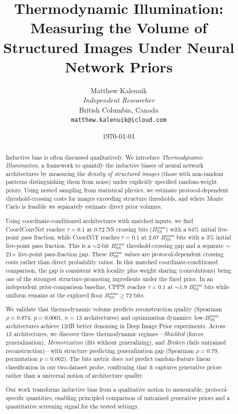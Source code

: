 \documentclass{article}
\title{Thermodynamic Illumination: Measuring the Volume of Structured Images Under Neural Network Priors}
\author{Matthew Kalenuik\\
\textit{Independent Researcher}\\
British Columbia, Canada\\
\texttt{matthew.kalenuik@icloud.com}}
\date{\today}
\begin{document}
\maketitle

\begin{abstract}
Inductive bias is often discussed qualitatively. We introduce \emph{Thermodynamic Illumination}, a framework to quantify the inductive biases of neural network architectures by measuring the \emph{density of structured images} (those with non-random patterns distinguishing them from noise) under explicitly specified random-weight priors. Using nested sampling from statistical physics, we estimate protocol-dependent threshold-crossing costs for images exceeding structure thresholds, and where Monte Carlo is feasible we separately estimate direct prior volumes.

Using coordinate-conditioned architectures with matched inputs, we find CoordConvNet reaches $\tau=0.1$ at 0.72 NS crossing bits ($B_{\text{NS}}^{\text{cross}}$) with a 64\% initial live-point pass fraction, while CoordViT reaches $\tau=0.1$ at 2.67 $B_{\text{NS}}^{\text{cross}}$ bits with a 3\% initial live-point pass fraction. This is a $\sim$2-bit $B_{\text{NS}}^{\text{cross}}$ threshold-crossing gap and a separate $\sim$21$\times$ live-point pass-fraction gap. These $B_{\text{NS}}^{\text{cross}}$ values are protocol-dependent crossing costs rather than direct probability ratios. In this matched coordinate-conditioned comparison, the gap is consistent with locality plus weight sharing (convolutions) being one of the strongest structure-promoting ingredients under the fixed prior. In an independent prior-comparison baseline, CPPN reaches $\tau=0.1$ at $\sim$1.9 $B_{\text{NS}}^{\text{cross}}$ bits while uniform remains at the explored floor $B_{\text{NS}}^{\text{cross}} \ge 72$ bits.

We validate that thermodynamic volume predicts reconstruction quality (Spearman $\rho=0.874$, $p=0.0001$, $n=13$ architectures) and optimization dynamics: low-$B_{\text{NS}}^{\text{cross}}$ architectures achieve 12dB better denoising in Deep Image Prior experiments. Across 13 architectures, we discover three thermodynamic regimes---\emph{Shielded} (forces generalization), \emph{Memorization} (fits without generalizing), and \emph{Broken} (fails untrained reconstruction)---with structure predicting generalization gap (Spearman $\rho=0.79$, permutation $p=0.002$). The bits metric does \emph{not} predict random-feature linear classification in our two-dataset probe, confirming that it captures generative priors rather than a universal notion of architecture quality.

Our work transforms inductive bias from a qualitative notion to measurable, protocol-specific quantities, enabling principled comparison of untrained generative priors and a quantitative screening signal for the tested settings.
\end{abstract}
\end{document}
